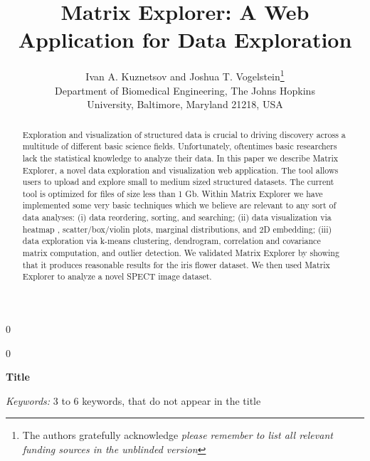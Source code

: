 \documentclass[12pt]{article}
\newcommand{\blind}{0}
\begin{document}
%

\def\spacingset#1{\renewcommand{\baselinestretch}%
{#1}\small\normalsize} \spacingset{1}
\setlength{\parindent}{5ex}



\blind
{
  \title{\bf Matrix Explorer: A Web Application for Data Exploration}
  \author{Ivan A. Kuznetsov and Joshua T. Vogelstein\thanks{
  		The authors gratefully acknowledge \textit{please remember to list all relevant funding sources in the unblinded version}}\hspace{.2cm} \\
    Department of Biomedical Engineering, The Johns Hopkins\\
    University, Baltimore, Maryland 21218, USA}
  \maketitle
} \fi

\blind
{
  \bigskip
  \bigskip
  \bigskip
  \begin{center}
    {\LARGE\bf Title}
\end{center}
  \medskip
} \fi

\bigskip
\begin{abstract}
\noindent Exploration and visualization of structured data is crucial to driving discovery across a multitude of different basic science fields. Unfortunately, oftentimes basic researchers lack the statistical knowledge to analyze their data. In this paper we describe Matrix Explorer, a novel data exploration and visualization web application. The tool allows users to upload and explore small to medium sized structured datasets. The current tool is optimized for files of size less than 1 Gb. Within Matrix Explorer we have implemented some very basic techniques which we believe are relevant to any sort of data analyses: (i) data reordering, sorting, and searching; (ii) data visualization via heatmap , scatter/box/violin plots, marginal distributions, and 2D embedding; (iii) data exploration via k-means clustering, dendrogram, correlation and covariance matrix computation, and outlier detection. We validated Matrix Explorer by showing that it produces reasonable results for the iris flower dataset. We then used Matrix Explorer to analyze a novel SPECT image dataset.
\end{abstract}

\noindent%
{\it Keywords:}  3 to 6 keywords, that do not appear in the title
\vfill
\end{document}
